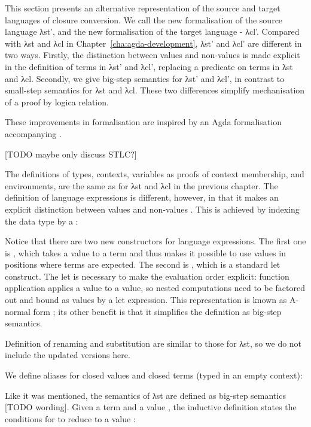 \documentclass[bsc,frontabs,oneside,singlespacing,parskip,deptreport]{infthesis}
\theoremstyle{definition}
\theoremstyle{lemma}
\begin{document}
This section presents an alternative representation of the source and
target languages of closure conversion. We call the new formalisation
of the source language λst', and the new formalisation of the target
language - λcl'. Compared with λst and λcl in
Chapter~\ref{cha:agda-development}, λst' and λcl' are different in two
ways. Firstly, the distinction between values and non-values is made
explicit in the definition of terms in λst' and λcl', replacing a
predicate on terms in λst and λcl. Secondly, we give big-step
semantics for λst' and λcl', in contrast to small-step semantics for
λst and λcl. These two differences simplify mechanisation of a proof
by logica relation.

These improvements in formalisation are inspired by an Agda
formalisation accompanying \cite{DBLP:conf/cpp/McLaughlinMS18}.

[TODO maybe only discuss STLC?]

The definitions of types, contexts, variables as proofs of context
membership, and environments, are the same as for λst and λcl in the
previous chapter. The definition of language expressions is different,
however, in that it makes an explicit distinction between values  and
non-values . This is achieved by indexing the  data
type by a :



Notice that there are two new constructors for language
expressions. The first one is , which takes a value 
to a term  and thus makes it possible to use values in
positions where terms are expected. The second is , which is
a standard let construct. The let is necessary to make the evaluation
order explicit: function application applies a value to a value, so
nested computations need to be factored out and bound as values by a
let expression. This representation is known as A-normal form
\cite{DBLP:conf/lfp/SabryF92}; its other benefit is that it simplifies
the definition as big-step semantics.

Definition of renaming and substitution are similar to those for
λst, so we do not include the updated versions here.

We define aliases for closed values  and closed terms
 (typed in an empty context):


Like it was mentioned, the semantics of λst are defined as big-step
semantics [TODO wording]. Given a term  and a value , the
inductive definition  states the conditions for  to
reduce to a value :
\end{document}
